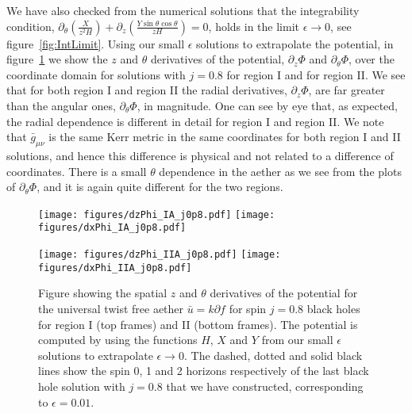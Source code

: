 \documentclass[12pt]{article}
\numberwithin{equation}{section}
\begin{document}
We have also checked from the numerical solutions that the integrability condition, $\partial_\theta \left( \frac{X}{z^2 H} \right) + \partial_z\left( \frac{Y \sin\theta \cos\theta}{z H} \right) = 0$, holds in the limit $\epsilon \to 0$, see figure~\ref{fig:IntLimit}.
Using our small $\epsilon$ solutions to extrapolate the potential, in  figure~\ref{fig:aethervector} we show the $z$ and $\theta$ derivatives of the potential, $\partial_z \Phi$ and $\partial_\theta \Phi$, over the coordinate domain for solutions with $j = 0.8$ for region I and for  region II. 
 We see that for both region I and region II the radial derivatives, $\partial_z \Phi$, are far greater than the angular ones, $\partial_\theta \Phi$, in magnitude.
 One can see by eye that, as expected, the radial dependence is different in detail for region I and region II. We note that $\bar{g}_{\mu\nu}$ is the same Kerr metric in the same coordinates for both region I and II solutions, and hence this difference is physical and not related to a difference of coordinates. There is a small $\theta$ dependence in the aether as we see from the plots of $\partial_\theta \Phi$, and it is again quite different for the two regions.

\begin{figure}
\centerline{  
  \texttt{[image: figures/dzPhi\_IA\_j0p8.pdf]}
  \texttt{[image: figures/dxPhi\_IA\_j0p8.pdf]}
  }
  \centerline{  
  \texttt{[image: figures/dzPhi\_IIA\_j0p8.pdf]}
  \texttt{[image: figures/dxPhi\_IIA\_j0p8.pdf]}
  }
  \caption{\label{fig:aethervector}
  Figure showing the spatial $z$ and $\theta$ derivatives of the potential for the universal twist free aether $\bar{u} = k \partial f$ for spin $j=0.8$ black holes for region I (top frames) and II (bottom frames). The potential is computed by using the functions $H$, $X$ and $Y$ from our small $\epsilon$ solutions to extrapolate $\epsilon \to 0$. The dashed, dotted and solid black lines show the spin 0, 1 and 2 horizons respectively of the last black hole solution with $j=0.8$ that we have constructed, corresponding to $\epsilon=0.01$.
  }
\end{figure}
\end{document}
